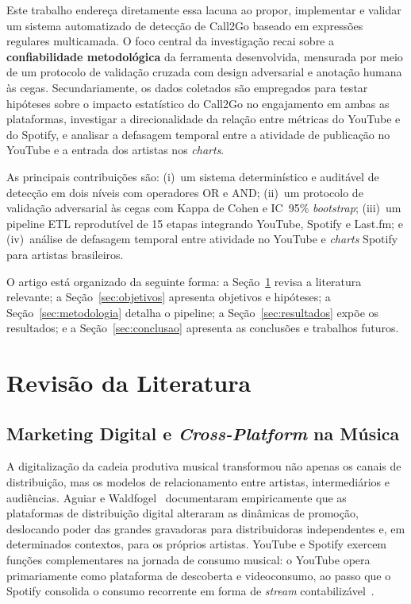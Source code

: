 ﻿\documentclass[12pt]{article}
\begin{document}
Este trabalho endereça diretamente essa lacuna ao propor, implementar e
validar um sistema automatizado de detecção de Call2Go baseado em expressões
regulares multicamada. O foco central da investigação recai sobre a
\textbf{confiabilidade metodológica} da ferramenta desenvolvida, mensurada
por meio de um protocolo de validação cruzada com design adversarial e anotação
humana às cegas. Secundariamente, os dados coletados são empregados para
testar hipóteses sobre o impacto estatístico do Call2Go no engajamento em
ambas as plataformas, investigar a direcionalidade da relação entre métricas
do YouTube e do Spotify, e analisar a defasagem temporal entre a atividade
de publicação no YouTube e a entrada dos artistas nos \textit{charts}.

As principais contribuições são: (i)~um sistema determinístico e auditável de
detecção em dois níveis com operadores OR e AND; (ii)~um protocolo de validação
adversarial às cegas com Kappa de Cohen e IC~95\% \textit{bootstrap};
(iii)~um pipeline ETL reprodutível de 15 etapas integrando YouTube, Spotify e
Last.fm; e (iv)~análise de defasagem temporal entre atividade no YouTube e
\textit{charts} Spotify para artistas brasileiros.

O artigo está organizado da seguinte forma: a Seção~\ref{sec:literatura}
revisa a literatura relevante; a Seção~\ref{sec:objetivos} apresenta objetivos
e hipóteses; a Seção~\ref{sec:metodologia} detalha o pipeline; a
Seção~\ref{sec:resultados} expõe os resultados; e a
Seção~\ref{sec:conclusao} apresenta as conclusões e trabalhos futuros.

\section{Revisão da Literatura}
\label{sec:literatura}

\subsection{Marketing Digital e \textit{Cross-Platform} na Música}

A digitalização da cadeia produtiva musical transformou não apenas os canais
de distribuição, mas os modelos de relacionamento entre artistas, intermediários
e audiências. Aguiar e Waldfogel~\cite{aguiar2021} documentaram empiricamente
que as plataformas de distribuição digital alteraram as dinâmicas de
promoção, deslocando poder das grandes gravadoras para distribuidoras
independentes e, em determinados contextos, para os próprios artistas. YouTube
e Spotify exercem funções complementares na jornada de consumo musical: o
YouTube opera primariamente como plataforma de descoberta e videoconsumo, ao
passo que o Spotify consolida o consumo recorrente em forma de \textit{stream}
contabilizável~\cite{wlomert2016}.
\end{document}
